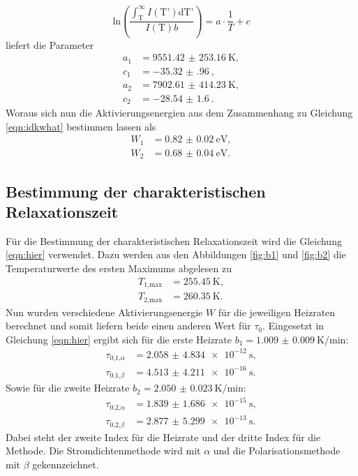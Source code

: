 \begin{equation}
\text{ln} \left( \frac{\int_{\text{T}}^{\infty} I(\text{T'}) \text{dT'} }{I(\text{T})b}\right) = a \cdot \frac{1}{T} + c
\end{equation}
liefert die Parameter
\begin{align*}
    a_1 &= \SI{9551.42(25316)}{\kelvin},\\
    c_1&= \SI{-35.32(96)}{},\\
    a_2 &= \SI{7902.61(41423)}{\kelvin},\\
    c_2&= \SI{-28.54(160)}{}.
\end{align*}
Woraus sich nun die Aktivierungsenergien aus dem Zusammenhang zu Gleichung \eqref{eqn:idkwhat} bestimmen lassen als
\begin{align}
    W_1 &= \SI{0.82(2)}{\electronvolt},\\
    W_2 &= \SI{0.68(4)}{\electronvolt}.
\end{align}
 
\subsection{Bestimmung der charakteristischen Relaxationszeit}
Für die Bestimmung der charakteristischen Relaxationszeit wird die Gleichung \eqref{eqn:hier} verwendet. Dazu werden aus den Abbildungen \ref{fig:b1} und \ref{fig:b2} die 
Temperaturwerte des ersten Maximums abgelesen zu
\begin{align}
    T_{1\text{,max}} &= \SI{255.45}{\kelvin},\\
    T_{2\text{,max}}&= \SI{260.35}{\kelvin}.
\end{align}
Nun wurden verschiedene Aktivierungsenergie $W$ für die jeweiligen Heizraten berechnet und somit liefern beide einen anderen Wert für $\tau_0$.
Eingesetzt in Gleichung \eqref{eqn:hier} ergibt sich für die erste Heizrate $ b_1 = \SI{1.009(9)}{\kelvin\per\minute}$:
\begin{align}
    \tau_{0\text{,}1\text{,}\alpha} &= \SI{2.058(4834)e-12}{\second},\\
    \tau_{0\text{,}1\text{,}\beta} &= \SI{4.513(4211)e-16}{\second}.
\end{align}
Sowie für die zweite Heizrate $b_2 = \SI{2.050(23)}{\kelvin\per\minute}$: 
\begin{align}
    \tau_{0\text{,}2\text{,}\alpha} &= \SI{1.839(1686)e-15}{\second},\\
    \tau_{0\text{,}2\text{,}\beta} &= \SI{2.877(5299)e-13}{\second}.
\end{align}
Dabei steht der zweite Index für die Heizrate und der dritte Index für die Methode. Die Stromdichtenmethode wird mit $\alpha$ und die Polarisationsmethode mit $\beta$
gekennzeichnet.


